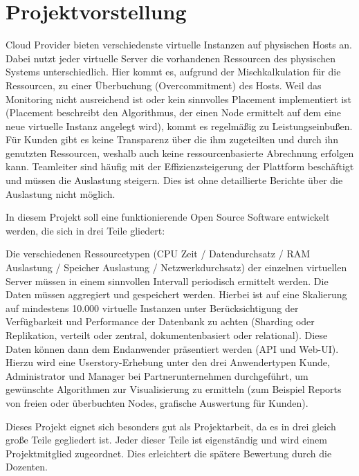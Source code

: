 \chapter{Projektvorstellung}
\label{subsec:projektvorstellung}
\gls{Cloud} Provider bieten verschiedenste virtuelle Instanzen auf physischen
Hosts an. Dabei nutzt jeder virtuelle Server die vorhandenen Ressourcen des
physischen Systems unterschiedlich. Hier kommt es, aufgrund der
Mischkalkulation für die Ressourcen, zu einer Überbuchung (Overcommitment) des
Hosts. Weil das Monitoring nicht ausreichend ist oder kein sinnvolles Placement
implementiert ist (Placement beschreibt den Algorithmus, der einen Node
ermittelt auf dem eine neue virtuelle Instanz angelegt wird), kommt es
regelmäßig zu Leistungseinbußen. Für Kunden gibt es keine Transparenz über die
ihm zugeteilten und durch ihn genutzten Ressourcen, weshalb auch keine
ressourcenbasierte Abrechnung erfolgen kann. Teamleiter sind häufig mit der
Effizienzsteigerung der Plattform beschäftigt und müssen die Auslastung
steigern. Dies ist ohne detaillierte Berichte über die Auslastung nicht
möglich.

In diesem Projekt soll eine funktionierende Open Source Software entwickelt
werden, die sich in drei Teile gliedert:

\begin{outline}
  \1 Die verschiedenen Ressourcetypen (CPU Zeit / Datendurchsatz / RAM
  Auslastung / Speicher Auslastung / Netzwerkdurchsatz) der einzelnen
  virtuellen Server müssen in einem sinnvollen Intervall periodisch ermittelt
  werden.
  \1 Die Daten müssen aggregiert und gespeichert werden. Hierbei ist auf eine
  Skalierung auf mindestens 10.000 virtuelle Instanzen unter Berücksichtigung
  der Verfügbarkeit und Performance der Datenbank zu achten (Sharding oder
  Replikation, verteilt oder zentral, dokumentenbasiert oder relational).
  \1 Diese Daten können dann dem Endanwender präsentiert werden (\gls{API} und
  Web\hyp{}UI). Hierzu wird eine Userstory\hyp{}Erhebung unter den drei
  Anwendertypen Kunde, Administrator und Manager bei Partnerunternehmen
  durchgeführt, um gewünschte Algorithmen zur Visualisierung zu ermitteln (zum
  Beispiel Reports von freien oder überbuchten Nodes, grafische Auswertung für
  Kunden).
\end{outline}

Dieses Projekt eignet sich besonders gut als Projektarbeit, da es in drei
gleich große Teile gegliedert ist. Jeder dieser Teile ist eigenständig und wird
einem Projektmitglied zugeordnet. Dies erleichtert die spätere Bewertung durch
die Dozenten.
\all%

